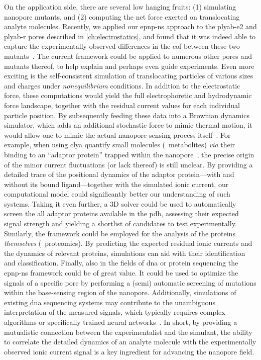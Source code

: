 On the application side, there are several low hanging fruits: (1) simulating nanopore mutants, and (2)
computing the net force exerted on translocating analyte molecules. Recently, we applied our \gls{epnp-ns}
approach to the \gls{plyab-e2} and \gls{plyab-r} pores described in \cref{ch:electrostatics}, and found that
it was indeed able to capture the experimentally observed differences in the \gls{eof} between these two
mutants~\cite{Huang-2020}. The current framework could be applied to numerous other pores and mutants thereof,
to help explain and perhaps even guide experiments. Even more exciting is the self-consistent simulation of
translocating particles of various sizes and charges under \emph{nonequilibrium} conditions. In addition to
the electrostatic force, these computations would yield the full electrophoretic and hydrodynamic force
landscape, together with the residual current values for each individual particle position. By subsequently
feeding these data into a Brownian dynamics simulator, which adds an additional stochastic force to mimic
thermal motion, it would allow one to mimic the actual nanopore sensing process
itself~\cite{Pederson-2015,Hulings-2018}. For example, when using \gls{clya} quantify small molecules
(\eg~metabolites) \textit{via} their binding to an ``adaptor protein'' trapped within the
nanopore~\cite{Zernia-2020}, the precise origin of the minor current fluctuations (or lack thereof) is still
unclear. By providing a detailed trace of the positional dynamics of the adaptor protein---with and without
its bound ligand---together with the simulated ionic current, our computational model could significantly
better our understanding of such systems. Taking it even further, a 3D solver could be used to automatically
screen the all adaptor proteins available in the \gls{pdb}, assessing their expected signal strength and
yielding a shortlist of candidates to test experimentally. Similarly, the framework could be employed for the
analysis of the proteins \emph{themselves} (\ie~proteomics). By predicting the expected residual ionic
currents and the dynamics of relevant proteins, simulations can aid with their identification and
classification. Finally, also in the fields of \gls{dna} or protein sequencing the \gls{epnp-ns} framework
could be of great value. It could be used to optimize the signals of a specific pore by performing a (semi)
automatic screening of mutations within the base-sensing region of the nanopore. Additionally, simulations of
existing \gls{dna} sequencing systems may contribute to the unambiguous interpretation of the measured
signals, which typically requires complex algorithms or specifically trained neural networks~\cite{Wick-2019}.
In short, by providing a mutualistic connection between the experimentalist and the simulant, the ability to
correlate the detailed dynamics of an analyte molecule with the experimentally observed ionic current signal
is a key ingredient for advancing the nanopore field.



\cleardoublepage

